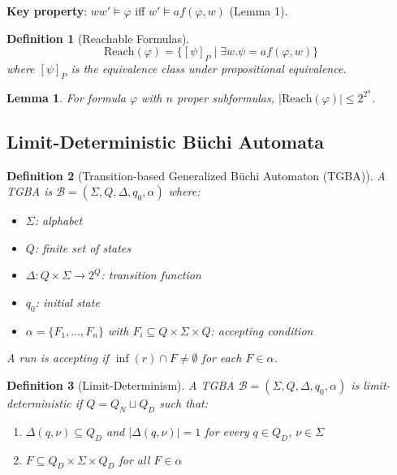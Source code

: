 \documentclass{article}
\newtheorem{definition}{Definition}
\newtheorem{lemma}{Lemma}
\begin{document}
\textbf{Key property}: $ww' \models \varphi$ iff $w' \models af(\varphi, w)$ (Lemma 1).

\begin{definition}[Reachable Formulas]
\begin{equation}
\text{Reach}(\varphi) = \{[\psi]_P \mid \exists w. \psi = af(\varphi, w)\}
\end{equation}
where $[\psi]_P$ is the equivalence class under propositional equivalence.
\end{definition}

\begin{lemma}
For formula $\varphi$ with $n$ proper subformulas, $|\text{Reach}(\varphi)| \leq 2^{2^n}$.
\end{lemma}

\subsection{Limit-Deterministic Büchi Automata}

\begin{definition}[Transition-based Generalized Büchi Automaton (TGBA)]
A TGBA is $\mathcal{B} = (\Sigma, Q, \Delta, q_0, \alpha)$ where:
\begin{itemize}
    \item $\Sigma$: alphabet
    \item $Q$: finite set of states
    \item $\Delta: Q \times \Sigma \to 2^Q$: transition function
    \item $q_0$: initial state
    \item $\alpha = \{F_1, \ldots, F_n\}$ with $F_i \subseteq Q \times \Sigma \times Q$: accepting condition
\end{itemize}

A run is accepting if $\inf(r) \cap F \neq \emptyset$ for each $F \in \alpha$.
\end{definition}

\begin{definition}[Limit-Determinism]
A TGBA $\mathcal{B} = (\Sigma, Q, \Delta, q_0, \alpha)$ is \emph{limit-deterministic} if $Q = Q_N \sqcup Q_D$ such that:
\begin{enumerate}
    \item $\Delta(q, \nu) \subseteq Q_D$ and $|\Delta(q, \nu)| = 1$ for every $q \in Q_D$, $\nu \in \Sigma$
    \item $F \subseteq Q_D \times \Sigma \times Q_D$ for all $F \in \alpha$
\end{enumerate}
\end{definition}
\end{document}
